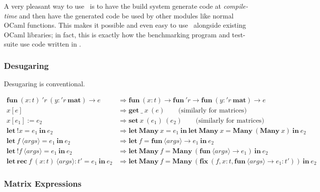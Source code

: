 A very pleasant way to use \lang\ is to have the build system generate code at
\emph{compile-time} and then have the generated code be used by other modules
like normal OCaml functions. This makes it possible and even easy to use \lang\
alongside existing OCaml libraries; in fact, this is exactly how the
benchmarking program and test-suite use code written in \lang.


\subsubsection{Desugaring}\label{subsubsec:desugaring}

Desugaring is conventional.

\begin{align*}
    \mathbf{fun}\ (x : t)\ 'r\ (y : {'r}\ \mathbf{mat}) \rightarrow e
    & \Rightarrow
    \mathbf{fun}\ (x : t) \rightarrow \mathbf{fun}\ {'r} \rightarrow
    \mathbf{fun}\ (y : {'r}\ \mathbf{mat}) \rightarrow e
\\
    x[e]
    & \Rightarrow
    \mathbf{get}\ \_\ x\ (e) \qquad \textrm{(similarly for matrices)}
\\
    x[e_1] := e_2
    & \Rightarrow
    \mathbf{set}\ x\ (e_1)\ (e_2) \qquad \textrm{(similarly for matrices)}
\\
    \mathbf{let}\ !x = e_1\ \mathbf{in}\ e_2
    & \Rightarrow
    \mathbf{let\ Many}\ x = e_1\ \mathbf{in\ }
    \mathbf{let\ Many}\ x = \mathbf{Many}\ (\mathbf{Many}\ x)\ \mathbf{in}\ e_2
\\
    \mathbf{let}\ f\ {\langle args \rangle} = e_1\ \mathbf{in}\ e_2
    & \Rightarrow
    \mathbf{let}\ f = \mathbf{fun}\ {\langle args \rangle} \rightarrow e_1\
    \mathbf{in}\ e_2
\\
    \mathbf{let}\ !f\ {\langle args \rangle} = e_1\ \mathbf{in}\ e_2
    & \Rightarrow
    \mathbf{let\ Many}\ f = \mathbf{Many}\ (\mathbf{fun}\ {\langle args \rangle}
    \rightarrow e_1)\ \mathbf{in}\ e_2
\\
    \mathbf{let\ rec}\ f\ (x : t)\ {\langle args \rangle} : {t'} = e_1\ \mathbf{in}\ e_2
    & \Rightarrow
    \mathbf{let\ Many}\ f = \mathbf{Many}\ (\mathbf{fix}\ (f, x : t,
    \mathbf{fun}\ {\langle args \rangle} \rightarrow e_1 : {t'} ))\ \mathbf{in}\ e_2
\end{align*}

\subsubsection{Matrix Expressions}

